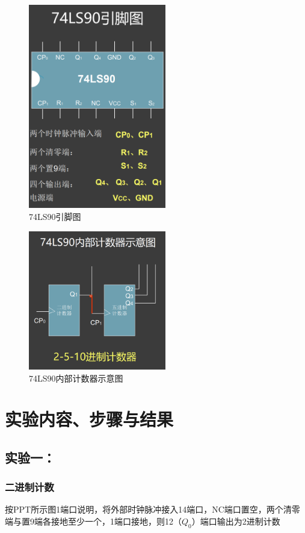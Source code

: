 \documentclass[a4paper,11pt,UTF8]{ctexart}
\begin{document}
\begin{figure}[H]
  \centering
  \includegraphics[width=6cm]{jsq1}
  \caption{74LS90引脚图}
  \label{fig:jsq1}
\end{figure}

\begin{figure}[H]
  \centering
  \includegraphics[width=6cm]{jsq2}
  \caption{74LS90内部计数器示意图}
  \label{fig:jsq2}
\end{figure}





\section{实验内容、步骤与结果}
 \subsection{实验一：\expa}
\subsubsection{二进制计数}
	按PPT所示图1端口说明，将外部时钟脉冲接入14端口，NC端口置空，两个清零端与置9端各接地至少一个，1端口接地，则12（$Q_0$）端口输出为2进制计数
\end{document}
